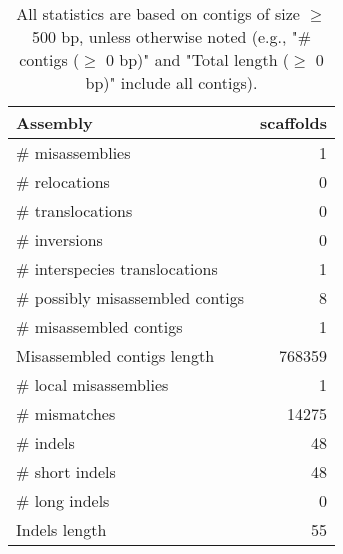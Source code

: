 \documentclass[12pt,a4paper]{article}
\begin{document}
\begin{table}[ht]
\begin{center}
\caption{All statistics are based on contigs of size $\geq$ 500 bp, unless otherwise noted (e.g., "\# contigs ($\geq$ 0 bp)" and "Total length ($\geq$ 0 bp)" include all contigs).}
\begin{tabular}{|l*{1}{|r}|}
\hline
Assembly & scaffolds \\ \hline
\# misassemblies & 1 \\ \hline
\hspace{5mm}\# relocations & 0 \\ \hline
\hspace{5mm}\# translocations & 0 \\ \hline
\hspace{5mm}\# inversions & 0 \\ \hline
\hspace{5mm}\# interspecies translocations & 1 \\ \hline
\# possibly misassembled contigs & 8 \\ \hline
\# misassembled contigs & 1 \\ \hline
Misassembled contigs length & 768359 \\ \hline
\# local misassemblies & 1 \\ \hline
\# mismatches & 14275 \\ \hline
\# indels & 48 \\ \hline
\hspace{5mm}\# short indels & 48 \\ \hline
\hspace{5mm}\# long indels & 0 \\ \hline
Indels length & 55 \\ \hline
\end{tabular}
\end{center}
\end{table}
\end{document}
